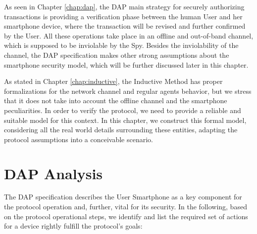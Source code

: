 \label{chap:formal-phones}

As seen in Chapter \ref{chap:dap}, the DAP main strategy for securely authorizing transactions is providing a verification phase between the human User and her smartphone device, where the transaction will be revised and further confirmed by the User. All these operations take place in an offline and out-of-band channel, which is supposed to be inviolable by the Spy. Besides the inviolability of the channel, the DAP specification makes other strong assumptions about the smartphone security model, which will be further discussed later in this chapter.

As stated in Chapter \ref{chap:inductive}, the Inductive Method has proper formalizations for the network channel and regular agents behavior, but we stress that it does not take into account the offline channel and the smartphone peculiarities. In order to verify the protocol, we need to provide a reliable and suitable model for this context. In this chapter, we construct this formal model, considering all the real world details surrounding these entities, adapting the protocol assumptions into a conceivable scenario.





\section{DAP Analysis}
The DAP specification describes the User Smartphone as a key component for the protocol operation and, further, vital for its security. In the following, based on the protocol operational steps, we identify and list the required set of actions for a device rightly fulfill the protocol's goals:

